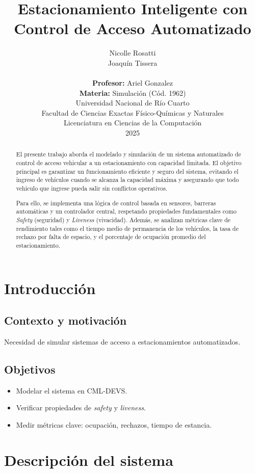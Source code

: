 \documentclass[12pt]{article}
\title{\textbf{Estacionamiento Inteligente con Control de Acceso Automatizado}}
\author{Nicolle Rosatti \\ Joaquín Tissera \\ \\
\textbf{Profesor:} Ariel Gonzalez \\
\textbf{Materia:} Simulación (Cód. 1962) \\
\vspace{0.5cm}
Universidad Nacional de Río Cuarto \\
Facultad de Ciencias Exactas Físico-Químicas y Naturales \\
Licenciatura en Ciencias de la Computación \\
2025
}
\date{}
\begin{document}
\maketitle

\begin{abstract}
El presente trabajo aborda el modelado y simulación de un sistema automatizado de control de acceso vehicular a un estacionamiento con capacidad limitada. El objetivo principal es garantizar un funcionamiento eficiente y seguro del sistema, evitando el ingreso de vehículos cuando se alcanza la capacidad máxima y asegurando que todo vehículo que ingrese pueda salir sin conflictos operativos.

Para ello, se implementa una lógica de control basada en sensores, barreras automáticas y un controlador central, respetando propiedades fundamentales como \textit{Safety} (seguridad) y \textit{Liveness} (vivacidad). Además, se analizan métricas clave de rendimiento tales como el tiempo medio de permanencia de los vehículos, la tasa de rechazo por falta de espacio, y el porcentaje de ocupación promedio del estacionamiento.
\end{abstract}


\tableofcontents

\section{Introducción}

\subsection{Contexto y motivación}
Necesidad de simular sistemas de acceso a estacionamientos automatizados.

\subsection{Objetivos}
\begin{itemize}
    \item Modelar el sistema en CML‐DEVS.
    \item Verificar propiedades de \textit{safety} y \textit{liveness}.
    \item Medir métricas clave: ocupación, rechazos, tiempo de estancia.
\end{itemize}


\section{Descripción del sistema}
\end{document}
